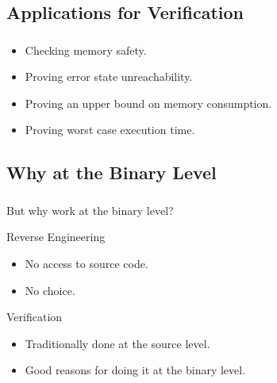 \documentclass[compress]{beamer}
\begin{document}
\subsection{Applications for Verification}
\begin{frame}[fragile]
	\frametitle{\insertsubsection}

	\begin{itemize}
		\vfill
	\item Checking memory safety.
		\vfill
	\item Proving error state unreachability.
		\vfill
	\item Proving an upper bound on memory consumption.
		\vfill
	\item Proving worst case execution time.
		\vfill
	\end{itemize}

\end{frame}


\subsection{Why at the Binary Level}
\begin{frame}[fragile]
	\frametitle{\insertsubsection}

	But why work at the binary level?
	\vfill

	\begin{block}{Reverse Engineering}
		\begin{itemize}
		\item No access to source code.
		\item No choice.
		\end{itemize}
	\end{block}

	\vfill

	\begin{block}{Verification}
		\begin{itemize}
		\item Traditionally done at the source level.
		\item Good reasons for doing it at the binary level.
		\end{itemize}
	\end{block}

\end{frame}
\end{document}
